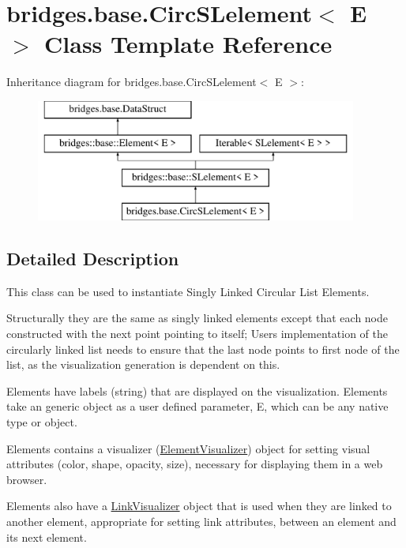 \hypertarget{classbridges_1_1base_1_1_circ_s_lelement}{}\section{bridges.\+base.\+Circ\+S\+Lelement$<$ E $>$ Class Template Reference}
\label{classbridges_1_1base_1_1_circ_s_lelement}
Inheritance diagram for bridges.\+base.\+Circ\+S\+Lelement$<$ E $>$\+:\begin{figure}[H]
\begin{center}
\leavevmode
\includegraphics[height=4.000000cm]{classbridges_1_1base_1_1_circ_s_lelement}
\end{center}
\end{figure}


\subsection{Detailed Description}
This class can be used to instantiate Singly Linked Circular List Elements. 

Structurally they are the same as singly linked elements except that each node constructed with the next point pointing to itself; User\textquotesingle{}s implementation of the circularly linked list needs to ensure that the last node points to first node of the list, as the visualization generation is dependent on this.

Elements have labels (string) that are displayed on the visualization. Elements take an generic object as a user defined parameter, E, which can be any native type or object.

Elements contains a visualizer (\mbox{\hyperlink{classbridges_1_1base_1_1_element_visualizer}{Element\+Visualizer}}) object for setting visual attributes (color, shape, opacity, size), necessary for displaying them in a web browser.

Elements also have a \mbox{\hyperlink{classbridges_1_1base_1_1_link_visualizer}{Link\+Visualizer}} object that is used when they are linked to another element, appropriate for setting link attributes, between an element and its next element.

